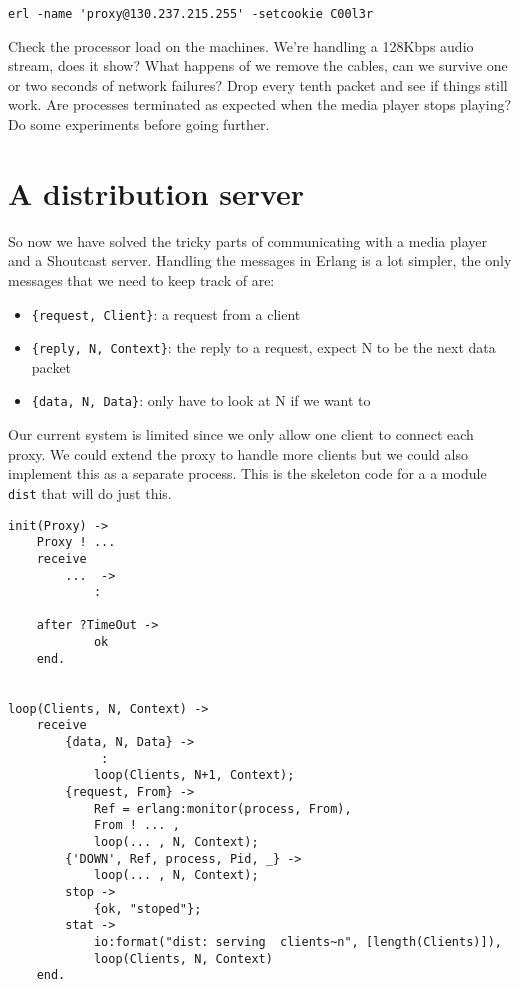 \documentclass[a4paper,11pt]{article}
\begin{document}
\begin{verbatim}
erl -name 'proxy@130.237.215.255' -setcookie C00l3r
\end{verbatim}

Check the processor load on the machines. We're handling a 128Kbps
audio stream, does it show? What happens of we remove the cables, can
we survive one or two seconds of network failures? Drop every tenth
packet and see if things still work. Are processes terminated as
expected when the media player stops playing? Do some experiments
before going further.

\section{A distribution server}

So now we have solved the tricky parts of communicating with a media
player and a Shoutcast server. Handling the messages in Erlang is a lot
simpler, the only messages that we need to keep track of are:

\begin{itemize}
\item {\tt \{request, Client\}}: a request from a client
\item {\tt \{reply, N, Context\}}: the reply to a request, expect N to be
  the next data packet
\item {\tt \{data, N, Data\}}: only have to look at N if we want to
\end{itemize}

Our current system is limited since we only allow one client to
connect each proxy. We could extend the proxy to handle more clients
but we could also implement this as a separate process. This is the
skeleton code for a a module {\tt dist} that will do just this.

\begin{verbatim}
init(Proxy) ->
    Proxy ! ...
    receive 
        ...  ->
            :

    after ?TimeOut ->
            ok
    end.


loop(Clients, N, Context) ->
    receive 
        {data, N, Data} ->
             :
            loop(Clients, N+1, Context);
        {request, From} ->
            Ref = erlang:monitor(process, From),
            From ! ... ,
            loop(... , N, Context);
        {'DOWN', Ref, process, Pid, _} ->
            loop(... , N, Context);
        stop ->
            {ok, "stoped"};
        stat ->
            io:format("dist: serving  clients~n", [length(Clients)]),
            loop(Clients, N, Context)
    end.
\end{verbatim}
\end{document}
